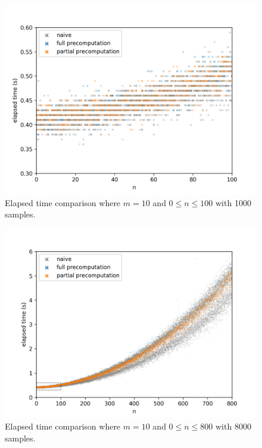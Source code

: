 \begin{figure}[H]
	\centering
	\includegraphics[scale=0.7]{figures/precomputation_cpu_small}
	\caption{Elapsed time comparison where $m=10$ and $0\leq n\leq 100$ with 1000 samples.}
\end{figure}

\begin{figure}[H]
	\centering
	\includegraphics[scale=0.7]{figures/precomputation_cpu_big}
	\caption{Elapsed time comparison where $m=10$ and $0\leq n\leq 800$ with 8000 samples.}
\end{figure}

